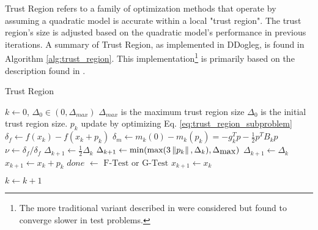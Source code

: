 Trust Region refers to a family of optimization methods that operate by assuming a quadratic model is accurate within a local "trust region". The trust region's size is adjusted based on the quadratic model's performance in previous iterations. A summary of Trust Region, as implemented in DDogleg, is found in Algorithm \ref{alg:trust_region}. This implementation\footnote{The more traditional variant described in \cite{numopt2006,fletcher1987} were considered but found to converge slower in test problems.} is primarily based on the description found in \cite{IMM2004}.

\begin{algorithm}{}
\caption{\label{alg:trust_region}Trust Region}
\begin{algorithmic}[1]
	\State $k \gets 0$, $\Delta_0 \in (0,\Delta_{max})$
	\State \quad $\Delta_{max}$ is the maximum trust region size
	\State \quad $\Delta_{0}$ is the initial trust region size. 
	\State $p_k$ update by optimizing Eq. \ref{eq:trust_region_subproblem} 
	\State $\delta_f \gets f(x_k) - f(x_k + p_k)$ 
	\State $\delta_m \gets m_k(0)-m_k(p_k) = -g^T_k p - \frac{1}{2}p^T B_k p$ 
	\State $\nu \gets \delta_f / \delta_f$ 
	 
		\State $\Delta_{k+1} \gets \frac{1}{2}\Delta_k$
	\Else
			\State $\Delta_{k+1} \gets \mbox{min}(\mbox{max}(3\left\lVert p_k\right\rVert,\Delta_k),\Delta_{\mbox{max}})$
		\Else
			\State $\Delta_{k+1} \gets \Delta_k$
		\EndIf
	\EndIf
	 
		\State $x_{k+1} \gets x_k + p_k$ 
		\State $done$ $\gets$ $\mbox{F-Test}$ or $\mbox{G-Test}$ 
	\Else
		\State $x_{k+1} \gets x_k$
	\EndIf

	\State $k \gets k + 1$
	\EndWhile
\end{algorithmic}
\end{algorithm}

